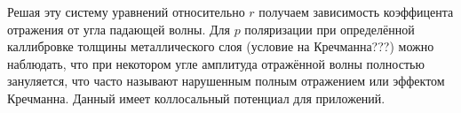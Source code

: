 Решая эту систему уравнений относительно $ r $ получаем зависимость коэффицента отражения от угла падающей волны. Для $ p $ поляризации при определённой каллибровке толщины металлического слоя (условие на Кречманна???)
можно наблюдать, что при некотором угле амплитуда отражённой волны полностью зануляется, что часто называют нарушенным полным отражением или эффектом Кречманна.
Данный имеет коллосальный потенциал для приложений.






